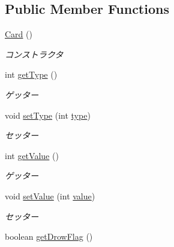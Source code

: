\subsection*{Public Member Functions}
\begin{DoxyCompactItemize}
\item 
\hyperlink{classjp_1_1gr_1_1java__conf_1_1yuta__yoshinaga_1_1java__trumpcards_1_1_card_a890c2b43ae091887939cf88c00cc35e6}{Card} ()
\begin{DoxyCompactList}\small\item\em コンストラクタ \end{DoxyCompactList}\item 
int \hyperlink{classjp_1_1gr_1_1java__conf_1_1yuta__yoshinaga_1_1java__trumpcards_1_1_card_a5e3f4e60a101867dfed9db97f417465d}{get\+Type} ()
\begin{DoxyCompactList}\small\item\em ゲッター \end{DoxyCompactList}\item 
void \hyperlink{classjp_1_1gr_1_1java__conf_1_1yuta__yoshinaga_1_1java__trumpcards_1_1_card_a23261f01f6e562e720b5cf55919f1342}{set\+Type} (int \hyperlink{classjp_1_1gr_1_1java__conf_1_1yuta__yoshinaga_1_1java__trumpcards_1_1_card_af77cbc403a7cb0fb5be8610c187e4ff0}{type})
\begin{DoxyCompactList}\small\item\em セッター \end{DoxyCompactList}\item 
int \hyperlink{classjp_1_1gr_1_1java__conf_1_1yuta__yoshinaga_1_1java__trumpcards_1_1_card_aebe71c344f7ef4d1f15d4d30d08898d0}{get\+Value} ()
\begin{DoxyCompactList}\small\item\em ゲッター \end{DoxyCompactList}\item 
void \hyperlink{classjp_1_1gr_1_1java__conf_1_1yuta__yoshinaga_1_1java__trumpcards_1_1_card_a64976287ff631099e8cde6717b1611c6}{set\+Value} (int \hyperlink{classjp_1_1gr_1_1java__conf_1_1yuta__yoshinaga_1_1java__trumpcards_1_1_card_ac71a33a6ef74fca7746b80f02dcd9485}{value})
\begin{DoxyCompactList}\small\item\em セッター \end{DoxyCompactList}\item 
boolean \hyperlink{classjp_1_1gr_1_1java__conf_1_1yuta__yoshinaga_1_1java__trumpcards_1_1_card_a6f9611299599e58a99f53e80e57c1d0c}{get\+Drow\+Flag} ()

\end{DoxyCompactItemize}
